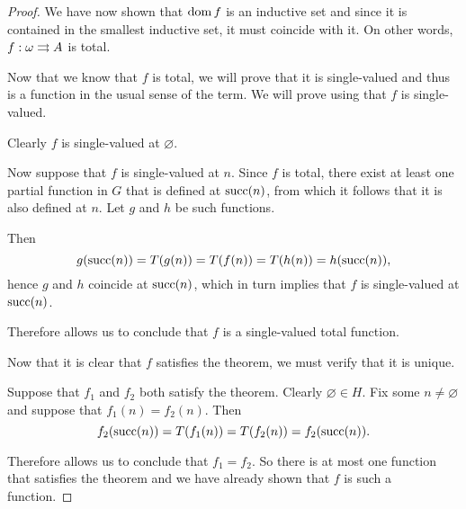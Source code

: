 \begin{proof}
  We have now shown that \( \operatorname{dom} f \) is an inductive set and since it is contained in the smallest inductive set, it must coincide with it. On other words, \( f: \omega \rightrightarrows A \) is total.

   Now that we know that \( f \) is total, we will prove that it is single-valued and thus is a function in the usual sense of the term. We will prove using  that \( f \) is single-valued.

  Clearly \( f \) is single-valued at \( \varnothing \).

  Now suppose that \( f \) is single-valued at \( n \). Since \( f \) is total, there exist at least one partial function in \( G \) that is defined at \( \operatorname{succ}(n) \), from which it follows that it is also defined at \( n \). Let \( g \) and \( h \) be such functions.

  Then
  \begin{equation*}
    g(\operatorname{succ}(n)) = T(g(n)) = T(f(n)) = T(h(n)) = h(\operatorname{succ}(n)),
  \end{equation*}
  hence \( g \) and \( h \) coincide at \( \operatorname{succ}(n) \), which in turn implies that \( f \) is single-valued at \( \operatorname{succ}(n) \).

  Therefore  allows us to conclude that \( f \) is a single-valued total function.

   Now that it is clear that \( f \) satisfies the theorem, we must verify that it is unique.

  Suppose that \( f_1 \) and \( f_2 \) both satisfy the theorem. Clearly \( \varnothing \in H \). Fix some \( n \neq \varnothing \) and suppose that \( f_1(n) = f_2(n) \). Then
  \begin{equation*}
    f_2(\operatorname{succ}(n)) = T(f_1(n)) = T(f_2(n)) = f_2(\operatorname{succ}(n)).
  \end{equation*}

  Therefore  allows us to conclude that \( f_1 = f_2 \). So there is at most one function that satisfies the theorem and we have already shown that \( f \) is such a function.
\end{proof}


